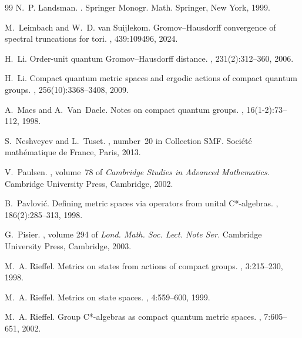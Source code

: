 \documentclass{amsart}
\theoremstyle{plain}
\theoremstyle{definition}
\theoremstyle{remark}
\begin{document}
\begin{thebibliography}{99}
		N.~P. Landsman.
		.
		\newblock Springer {{Monogr}}. {{Math}}. Springer, New York, 1999.
		
		M.~Leimbach and W.~D. {van Suijlekom}.
		\newblock Gromov--{{Hausdorff}} convergence of spectral truncations for tori.
		, 439:109496, 2024.
		
		H.~Li.
		\newblock Order-unit quantum {{Gromov}}--{{Hausdorff}} distance.
		, 231(2):312--360, 2006.
		
		H.~Li.
		\newblock Compact quantum metric spaces and ergodic actions of compact quantum
		groups.
		, 256(10):3368--3408, 2009.
		
		A.~Maes and A.~Van~Daele.
		\newblock Notes on compact quantum groups.
		, 16(1-2):73--112, 1998.
		
		S.~Neshveyev and L.~Tuset.
		,
		\newblock number~20 in Collection {{SMF}}. Soci{\'e}t{\'e} math{\'e}matique de
		France, Paris, 2013.
		
		V.~Paulsen.
		, volume~78 of
		{\em Cambridge {{Studies}} in {{Advanced Mathematics}}}.
		\newblock Cambridge University Press, Cambridge, 2002.
		
		B.~Pavlovi{\'c}.
		\newblock Defining metric spaces via operators from unital {{C}}*-algebras.
		, 186(2):285--313, 1998.
		
		G.~Pisier.
		, volume 294 of {\em Lond.
			{{Math}}. {{Soc}}. {{Lect}}. {{Note Ser}}.}
		\newblock Cambridge University Press, Cambridge, 2003.
		
		M.~A. Rieffel.
		\newblock Metrics on states from actions of compact groups.
		, 3:215--230, 1998.
		
		M.~A. Rieffel.
		\newblock Metrics on state spaces.
		, 4:559--600, 1999.
		
		M.~A. Rieffel.
		\newblock Group {{C}}*-algebras as compact quantum metric spaces.
		, 7:605--651, 2002.
		

\end{thebibliography}
\end{document}
